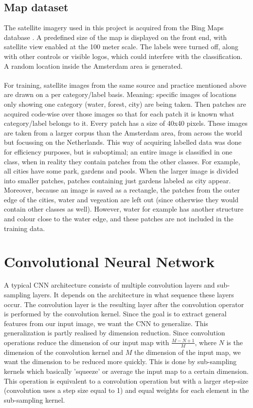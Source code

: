 \documentclass[a4paper,onecolumn]{report}
\begin{document}
\section{Map dataset}
The satellite imagery used in this project is acquired from the Bing Maps database \cite{bing}. A predefined size of the map is displayed on the front end, with satellite view enabled at the 100 meter scale. The labels were turned off, along with other controls or visible logos, which could interfere with the classification.  A random location inside the Amsterdam area is generated.
\\\\
For training, satellite images from the same source and practice mentioned above are drawn on a per category/label basis. Meaning: specific images of locations only showing one category (water, forest, city) are being taken. Then patches are acquired code-wise over those images so that for each patch it is known what category/label belongs to it. Every patch has a size of 40x40 pixels. These images are taken from a larger corpus than the Amsterdam area, from across the world but focussing on the Netherlands. This way of acquiring labelled data was done for efficiency purposes, but is suboptimal; an entire image is classified in one class, when in reality they contain patches from the other classes. For example, all cities have some park, gardens and pools. When the larger image is divided into smaller patches, patches containing just gardens labeled as city appear. Moreover, because an image is saved as a rectangle, the patches from the outer edge of the cities, water and vegeation are left out (since otherwise they would contain other classes as well). However, water for example has another structure and colour close to the water edge, and these patches are not included in the training data. 

\chapter{Convolutional Neural Network}
\label{chap:CNN}
A typical CNN architecture consists of multiple convolution layers and sub-sampling layers. It depends on the architecture in what sequence these layers occur. The convolution layer is the resulting layer after the convolution operator is performed by the convolution kernel. Since the goal is to extract general features from our input image, we want the CNN to generalize. This generalization is partly realised by dimension reduction. Since convolution operations reduce the dimension of our input map with $\frac{M-N+1}{M}$, where $N$ is the dimension of the convolution kernel and $M$ the dimension of the input map, we want the dimension to be reduced more quickly. This is done by sub-sampling kernels which basically 'squeeze' or average the input map to a certain dimension. This operation is equivalent to a convolution operation but with a larger step-size (convolution uses a step size equal to 1) and equal weights for each element in the sub-sampling kernel.
\end{document}
